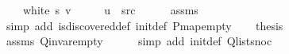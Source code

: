 \begin{isabellebody}
\ \ \ {\isachardoublequoteopen}{\isasymnot}\ white\ s\ v{\isachardoublequoteclose}\isanewline
%
\isadelimproof
%
\endisadelimproof
%
\isatagproof
{}\isamarkupfalse%
\ {\isacharminus}{\kern0pt}\isanewline
\ \ \isamarkupfalse%
\ {\isachardoublequoteopen}u\ {\isacharequal}{\kern0pt}\ src{\isachardoublequoteclose}\isanewline
\ \ \ \ \isamarkupfalse%
\ assms{\isacharparenleft}{\kern0pt}{}{\isacharparenright}{\kern0pt}\isanewline
\ \ \ \ \isamarkupfalse%
\ {\isacharparenleft}{\kern0pt}simp\ add{\isacharcolon}{\kern0pt}\ is{\isacharunderscore}{\kern0pt}discovered{\isacharunderscore}{\kern0pt}def\ init{\isacharunderscore}{\kern0pt}def\ P{\isachardot}{\kern0pt}map{\isacharunderscore}{\kern0pt}empty{\isacharparenright}{\kern0pt}\isanewline
\ \ \isamarkupfalse%
\ {\isacharquery}{\kern0pt}thesis\isanewline
\ \ \ \ \isamarkupfalse%
\ assms{\isacharparenleft}{\kern0pt}{}{\isacharparenright}{\kern0pt}\ Q{\isachardot}{\kern0pt}invar{\isacharunderscore}{\kern0pt}empty\isanewline
\ \ \ \ \isamarkupfalse%
\ {\isacharparenleft}{\kern0pt}simp\ add{\isacharcolon}{\kern0pt}\ init{\isacharunderscore}{\kern0pt}def\ Q{\isachardot}{\kern0pt}list{\isacharunderscore}{\kern0pt}snoc{\isacharparenright}{\kern0pt}\isanewline
{}\isamarkupfalse%
%
\endisatagproof
{\isafoldproof}%
%
\isadelimproof
%
\endisadelimproof
%
\isadelimdocument
%
\endisadelimdocument
%
\isatagdocument
%

\end{isabellebody}
